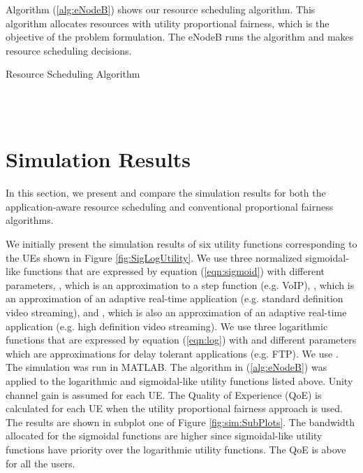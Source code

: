 \documentclass[conference]{IEEEtran}
\begin{document}
Algorithm (\ref{alg:eNodeB}) shows our resource scheduling algorithm. This algorithm allocates resources with utility proportional fairness, which is the objective of the problem formulation. The eNodeB runs the algorithm and makes resource scheduling decisions.  

\begin{algorithm}
\caption{Resource Scheduling Algorithm}\label{alg:eNodeB}
\begin{algorithmic}
\STATE {; }
\FOR {}
	\IF {} 
	\STATE {} \\
	\STATE {} \\
\ENDIF 
\ENDFOR
\end{algorithmic}
\end{algorithm}

\section{Simulation Results}\label{sec:sim}

In this section, we present and compare the simulation results for both the application-aware resource scheduling and conventional proportional fairness algorithms. 

We initially present the simulation results of six utility functions corresponding to the UEs shown in Figure \ref{fig:SigLogUtility}. We use three normalized sigmoidal-like functions that are expressed by equation (\ref{eqn:sigmoid}) with different parameters, ,  which is an approximation to a step function (e.g. VoIP), ,  which is an approximation of an adaptive real-time application (e.g. standard definition video streaming), and ,   which is also an approximation of an adaptive real-time application (e.g. high definition video streaming). We use three logarithmic functions that are expressed by equation (\ref{eqn:log}) with  and different  parameters which are approximations for delay tolerant applications (e.g. FTP). We use . The simulation was run in MATLAB. The algorithm in (\ref{alg:eNodeB}) was applied to the logarithmic and sigmoidal-like utility functions listed above. Unity channel gain is assumed for each UE. The Quality of Experience (QoE) is calculated for each UE when the utility proportional fairness approach is used. The results are shown in subplot one of Figure \ref{fig:sim:SubPlots}. The bandwidth allocated for the sigmoidal functions are higher since sigmoidal-like utility functions have priority over the logarithmic utility functions. The QoE is above  for all the users. 
\end{document}
